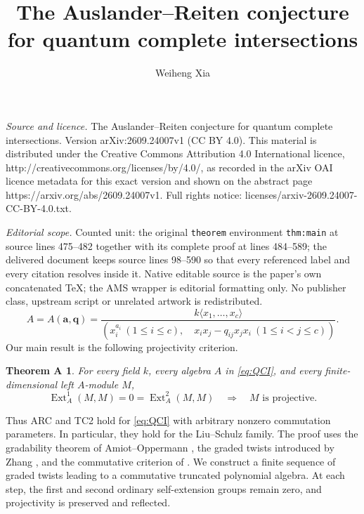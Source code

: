\documentclass[10pt,a4paper]{amsart}
\numberwithin{equation}{section}
\newtheorem*{theoremA}{Theorem A}
\DeclareMathOperator{\Ext}{Ext}
\begin{document}
\title[The Auslander--Reiten conjecture for quantum complete inters]{The Auslander--Reiten conjecture for quantum complete intersections}
\author{Weiheng Xia}
\date{}
\maketitle
\noindent\emph{Source and licence.} The Auslander--Reiten conjecture for quantum complete intersections. Version arXiv:2609.24007v1 (CC BY 4.0). This material is distributed under the Creative Commons Attribution 4.0 International licence, http://creativecommons.org/licenses/by/4.0/, as recorded in the arXiv OAI licence metadata for this exact version and shown on the abstract page https://arxiv.org/abs/2609.24007v1. Full rights notice: licenses/arxiv-2609.24007-CC-BY-4.0.txt.\par\smallskip
\noindent\textit{Editorial scope.} Counted unit: the original \texttt{theorem} environment \texttt{thm:main} at source lines 475--482 together with its complete proof at lines 484--589; the delivered document keeps source lines 98--590 so that every referenced label and every citation resolves inside it. Native editable source is the paper's own concatenated TeX; the AMS wrapper is editorial formatting only. No publisher class, upstream script or unrelated artwork is redistributed.
\begin{equation}\label{eq:QCI}
 A=A(\mathbf a,\mathbf q)=
 \frac{k\langle x_1,\ldots,x_c\rangle}
 {(x_i^{a_i}\ (1\leq i\leq c),\quad
   x_ix_j-q_{ij}x_jx_i\ (1\leq i<j\leq c))}.
\end{equation}
Our main result is the following projectivity criterion.

\begin{theoremA}
For every field \(k\), every algebra \(A\) in \eqref{eq:QCI}, and every
finite-dimensional left \(A\)-module \(M\),
\[
 \Ext_A^1(M,M)=0=\Ext_A^2(M,M)
 \quad\Longrightarrow\quad M\text{ is projective}.
\]
\end{theoremA}

Thus ARC and TC2 hold for \eqref{eq:QCI} with arbitrary nonzero
commutation parameters. In particular, they hold for the Liu--Schulz
family. The proof uses the gradability theorem of Amiot--Oppermann
\cite[Corollary 4.5]{AO13}, the graded twists introduced by Zhang
\cite{Zhang96}, and the commutative criterion of
\cite[Theorem 4.2]{AB00}. We construct a finite sequence of graded twists leading to a commutative truncated polynomial algebra. At each step, the first and second ordinary self-extension groups remain zero, and projectivity is preserved and reflected.
\end{document}
